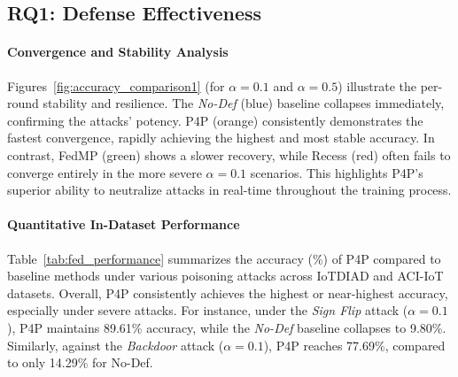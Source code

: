 \subsection{RQ1: Defense Effectiveness}

\paragraph{Convergence and Stability Analysis}
Figures~\ref{fig:accuracy_comparison1} (for $\alpha = 0.1$ and $\alpha = 0.5$) illustrate the per-round stability and resilience. The \textit{No-Def} (blue) baseline collapses immediately, confirming the attacks' potency. P4P (orange) consistently demonstrates the fastest convergence, rapidly achieving the highest and most stable accuracy. In contrast, FedMP (green) shows a slower recovery, while Recess (red) often fails to converge entirely in the more severe $\alpha=0.1$ scenarios. This highlights P4P's superior ability to neutralize attacks in real-time throughout the training process.

\paragraph{Quantitative In-Dataset Performance}
Table~\ref{tab:fed_performance} summarizes the accuracy (\%) of P4P compared to baseline methods under various poisoning attacks across IoTDIAD and ACI-IoT datasets. Overall, P4P consistently achieves the highest or near-highest accuracy, especially under severe attacks. For instance, under the \textit{Sign Flip} attack ($\alpha=0.1$), P4P maintains 89.61\% accuracy, while the \textit{No-Def} baseline collapses to 9.80\%. Similarly, against the \textit{Backdoor} attack ($\alpha=0.1$), P4P reaches 77.69\%, compared to only 14.29\% for No-Def. 

